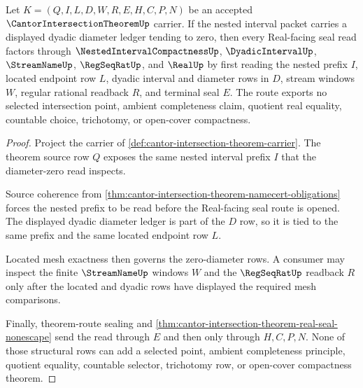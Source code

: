 \begin{theorem}
\label{thm:cantor-intersection-diameter-zero-route}
Let $K=(Q,I,L,D,W,R,E,H,C,P,N)$ be an accepted $\CantorIntersectionTheoremUp$ carrier. If the nested interval packet carries a displayed dyadic diameter ledger tending to zero, then every Real-facing seal read factors through $\NestedIntervalCompactnessUp$, $\DyadicIntervalUp$, $\StreamNameUp$, $\RegSeqRatUp$, and $\RealUp$ by first reading the nested prefix $I$, located endpoint row $L$, dyadic interval and diameter rows in $D$, stream windows $W$, regular rational readback $R$, and terminal seal $E$. The route exports no selected intersection point, ambient completeness claim, quotient real equality, countable choice, trichotomy, or open-cover compactness.
\end{theorem}
\begin{proof}
Project the carrier of \autoref{def:cantor-intersection-theorem-carrier}. The theorem source row $Q$ exposes the same nested interval prefix $I$ that the diameter-zero read inspects.

Source coherence from \autoref{thm:cantor-intersection-theorem-namecert-obligations} forces the nested prefix to be read before the Real-facing seal route is opened. The displayed dyadic diameter ledger is part of the $D$ row, so it is tied to the same prefix and the same located endpoint row $L$.

Located mesh exactness then governs the zero-diameter rows. A consumer may inspect the finite $\StreamNameUp$ windows $W$ and the $\RegSeqRatUp$ readback $R$ only after the located and dyadic rows have displayed the required mesh comparisons.

Finally, theorem-route sealing and \autoref{thm:cantor-intersection-theorem-real-seal-nonescape} send the read through $E$ and then only through $H,C,P,N$. None of those structural rows can add a selected point, ambient completeness principle, quotient equality, countable selector, trichotomy row, or open-cover compactness theorem.
\end{proof}



